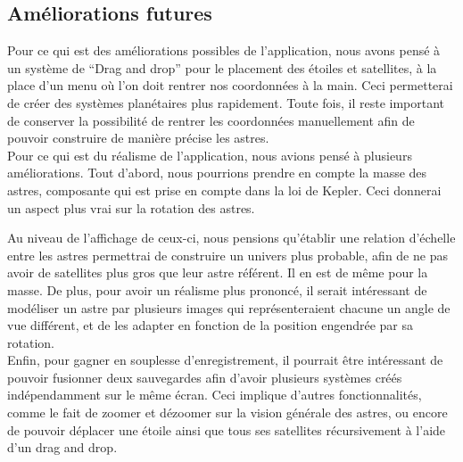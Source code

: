 \documentclass[a4paper,10pt]{article}
\begin{document}
\subsection{Améliorations futures}
Pour ce qui est des améliorations possibles de l'application, nous avons pensé à un système de ``Drag and drop'' pour le placement des étoiles et satellites, à la place d'un menu où l'on doit rentrer nos coordonnées à la main. Ceci permetterai de créer des systèmes planétaires plus rapidement. Toute fois, il reste important de conserver la possibilité de rentrer les coordonnées manuellement afin de pouvoir construire de manière précise les astres.\\

Pour ce qui est du réalisme de l'application, nous avions pensé à plusieurs améliorations. Tout d'abord, nous pourrions prendre en compte la masse des astres, composante qui est prise en compte dans la loi de Kepler. Ceci donnerai un aspect plus vrai sur la rotation des astres. 

Au niveau de l'affichage de ceux-ci, nous pensions qu'établir une relation d'échelle entre les astres permettrai de construire un univers plus probable, afin de ne pas avoir de satellites plus gros que leur astre référent. Il en est de même pour la masse. De plus, pour avoir un réalisme plus prononcé, il serait intéressant de modéliser un astre par plusieurs images qui représenteraient chacune un angle de vue différent, et de les adapter en fonction de la position engendrée par sa rotation.\\

Enfin, pour gagner en souplesse d'enregistrement, il pourrait être intéressant de pouvoir fusionner deux sauvegardes afin d'avoir plusieurs systèmes créés indépendamment sur le même écran. Ceci implique d'autres fonctionnalités, comme le fait de zoomer et dézoomer sur la vision générale des astres, ou encore de pouvoir déplacer une étoile ainsi que tous ses satellites récursivement à l'aide d'un drag and drop.
\end{document}

